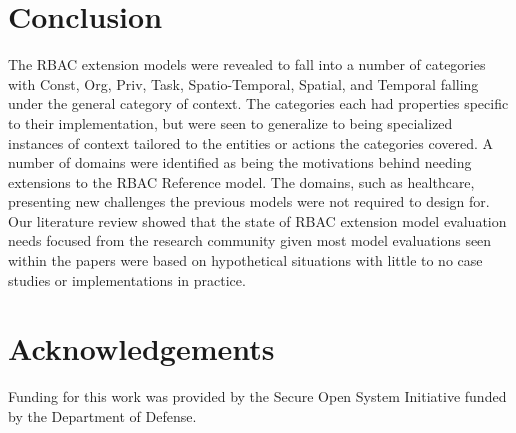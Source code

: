 \section{Conclusion} \label{sec:conclusion}

The RBAC extension models were revealed to fall into a number of categories with Const, Org, Priv, Task, Spatio-Temporal, Spatial, and Temporal falling under the general category of context. 
The categories each had properties specific to their implementation, but were seen to generalize to being specialized instances of context tailored to the entities or actions the categories covered.
A number of domains were identified as being the motivations behind needing extensions to the RBAC Reference model.  The domains, such as healthcare, presenting new challenges the previous models were not
required to design for.  Our literature review showed that the state of RBAC extension model evaluation needs focused from the research community given most model evaluations seen within the papers were
based on hypothetical situations with little to no case studies or implementations in practice.

\section{Acknowledgements} \label{sec:acknowledgements}

Funding for this work was provided by the Secure Open System Initiative funded by the Department of Defense.